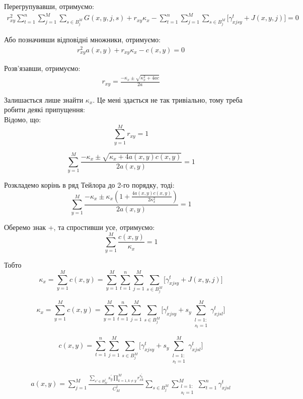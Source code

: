 \documentclass[14pt]{article}
\begin{document}
Перегрупувавши, отримуємо:
\begin{align*}
r_{xy}^{2} \sum_{t=1}^{n} \sum_{j=1}^{M} \sum_{s \in B^M_j} G(x, y, j, s) + r_{xy} \kappa_x - \sum_{t=1}^{n} \sum_{j=1}^{M} \sum_{s \in B^M_j} \Big[ \gamma_{xjsy}^t + J(x, y, j) \Big] = 0
\end{align*}

Або позначивши відповідні множники, отримуємо:
\begin{align*}
r_{xy}^{2} a(x, y) + r_{xy} \kappa_x - c(x, y) = 0
\end{align*}

Розв'язавши, отримуємо:
\begin{align*}
r_{xy} = \frac{- \kappa_x \pm \sqrt{\kappa_x^2 + 4ac}}{2a}
\end{align*}

Залишається лише знайти $\kappa_x$. Це мені здається не так тривіально, тому треба робити деякі припущення:\\

Відомо, що:
$$\sum_{y=1}^{M} r_{xy} = 1$$


$$\sum_{y=1}^{M} \frac{- \kappa_x \pm \sqrt{\kappa_x + 4a(x, y)c(x, y)}}{2a(x, y)} = 1$$

Розкладемо корінь в ряд Тейлора до 2-го порядку, тоді: \\
$$\sum_{y=1}^{M} \frac{- \kappa_x \pm \kappa_x (1 + \frac{4a(x,y) c(x, y)}{2 \kappa_x^2})}{2a(x, y)} = 1$$

Оберемо знак +, та спростивши усе, отримуємо:
$$\sum_{y=1}^{M} \frac{c(x, y)}{\kappa_x} = 1$$

Тобто 
$$\kappa_x = \sum_{y=1}^{M} c(x, y) = \sum_{y=1}^{M} \sum_{t=1}^{n} \sum_{j=1}^{M} \sum_{s \in B^M_j} \Big[ \gamma_{xjsy}^t + J(x, y, j)\Big]$$

$$\kappa_x = \sum_{y=1}^{M} c(x, y) = \sum_{y=1}^{M} \sum_{t=1}^{n} \sum_{j=1}^{M} \sum_{s \in B^M_j} \Big[ \gamma_{xjsy}^t + s_y \sum_{\substack{l=1:\\ s_l=1}}^{M} \gamma_{xjsl}^t \Big]$$

$$c(x, y) = \sum_{t=1}^{n} \sum_{j=1}^{M} \sum_{s \in B^M_j} \Big[ \gamma_{xjsy}^t + s_y \sum_{\substack{l=1:\\ s_l=1}}^{M} \gamma_{xjsl}^t \Big]$$


\begin{align*}
a(x, y) = \sum_{j=1}^{M} \frac{\sum_{s' \in B^j_M} s^{'}_y \prod_{k=1,  k \neq y}^{M} r_{xk}^{s^{'}_k}}{C_M^j} \sum_{s \in B^M_j}   \sum_{\substack{l=1:\\ s_l=1}}^{M} \sum_{t=1}^{n} \gamma_{xjsl}^t
\end{align*}
\end{document}
